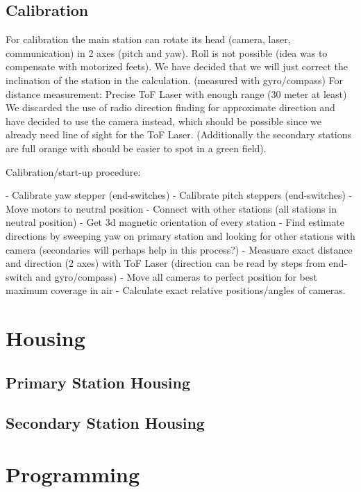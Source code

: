 \subsection{Calibration}

For calibration the main station can rotate its head (camera, laser, communication) in 2 axes (pitch and yaw).
Roll is not possible (idea was to compensate with motorized feets). We have decided that we will just correct the inclination of the station in the calculation. (measured with gyro/compass)
For distance measurement: Precise ToF Laser with enough range (30 meter at least)
We discarded the use of radio direction finding for approximate direction and have decided to use the camera instead, which should be possible since we already need line of sight for the ToF Laser. (Additionally the secondary stations are full orange with should be easier to spot in a green field).

Calibration/start-up procedure:

- Calibrate yaw stepper (end-switches)
- Calibrate pitch steppers (end-switches)
- Move motors to neutral position
- Connect with other stations (all stations in neutral position)
- Get 3d magnetic orientation of every station
- Find estimate directions by sweeping yaw on primary station and looking for other stations with camera (secondaries will perhaps help in this process?)
- Measuare exact distance and direction (2 axes) with ToF Laser (direction can be read by steps from end-switch and gyro/compass)
- Move all cameras to perfect position for best maximum coverage in air
- Calculate exact relative positions/angles of cameras.

\section{Housing}

\subsection{Primary Station Housing}

\subsection{Secondary Station Housing}

\section{Programming}

